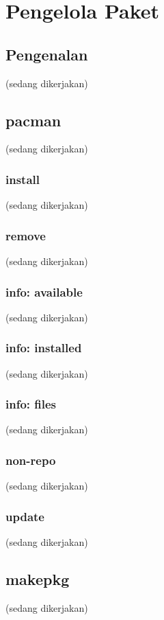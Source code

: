 \documentclass[12pt,]{article}
\begin{document}
	\newpage
	\section{Pengelola Paket}
	
	\subsection{Pengenalan}
	(sedang dikerjakan)
	
	\subsection{pacman}
	(sedang dikerjakan)

	\subsubsection{install}
	(sedang dikerjakan)
	
	\subsubsection{remove}
	(sedang dikerjakan)
	
	\subsubsection{info: available}
	(sedang dikerjakan)

	\subsubsection{info: installed}
	(sedang dikerjakan)
	
	\subsubsection{info: files}
	(sedang dikerjakan)

	\subsubsection{non-repo}
	(sedang dikerjakan)

	\subsubsection{update}
	(sedang dikerjakan)

	\subsection{makepkg}
	(sedang dikerjakan)
	
\end{document}
